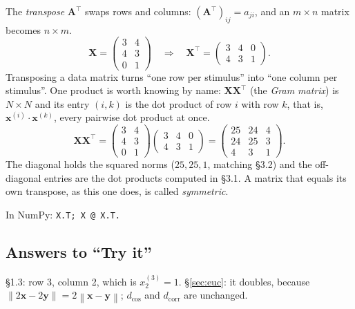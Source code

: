 \documentclass[11pt]{article}
\newcommand{\vx}{\bm{x}}
\newcommand{\vy}{\bm{y}}
\newcommand{\mX}{\bm{X}}
\newcommand{\norm}[1]{\left\lVert #1 \right\rVert}
\newcommand{\dcos}{d_{\cos}}
\newcommand{\dcorr}{d_{\mathrm{corr}}}
\newcommand{\np}[1]{{\small\color{lightgray}In NumPy: \texttt{#1}}\par}
\begin{document}
The \emph{transpose} $\bm{A}^{\top}$ swaps rows and columns: $(\bm{A}^{\top})_{ij} = a_{ji}$,
and an $m \times n$ matrix becomes $n \times m$.
\[
\mX = \begin{pmatrix} 3 & 4 \\ 4 & 3 \\ 0 & 1 \end{pmatrix}
\quad\Longrightarrow\quad
\mX^{\top} = \begin{pmatrix} 3 & 4 & 0 \\ 4 & 3 & 1 \end{pmatrix} .
\]
Transposing a data matrix turns ``one row per stimulus'' into ``one column per stimulus''.
One product is worth knowing by name: $\mX\mX^{\top}$ (the \emph{Gram matrix}) is
$N \times N$ and its entry $(i, k)$ is the dot product of row $i$ with row $k$, that is,
$\vx^{(i)} \cdot \vx^{(k)}$, every pairwise dot product at once.
\[
\mX\mX^{\top} =
\begin{pmatrix} 3 & 4 \\ 4 & 3 \\ 0 & 1 \end{pmatrix}
\begin{pmatrix} 3 & 4 & 0 \\ 4 & 3 & 1 \end{pmatrix}
=
\begin{pmatrix} 25 & 24 & 4 \\ 24 & 25 & 3 \\ 4 & 3 & 1 \end{pmatrix} .
\]
The diagonal holds the squared norms ($25, 25, 1$, matching \S3.2) and the off-diagonal
entries are the dot products computed in \S3.1. A matrix that equals its own transpose,
as this one does, is called \emph{symmetric}.

\np{X.T; X @ X.T.}

\subsection*{Answers to ``Try it''}
\S1.3: row 3, column 2, which is $x^{(3)}_2 = 1$.\quad
\S\ref{sec:euc}: it doubles, because $\norm{2\vx - 2\vy} = 2\norm{\vx - \vy}$;
$\dcos$ and $\dcorr$ are unchanged.
\end{document}
